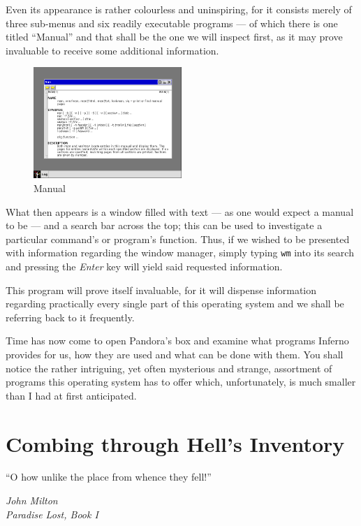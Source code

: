 \documentclass[a5paper,twoside,12pt]{report}
\begin{document}
  Even its appearance is rather colourless and uninspiring, for it consists merely of three sub-menus and six readily executable programs — of which there is one titled ``Manual'' and that shall be the one we will inspect first, as it may prove invaluable to receive some additional information.

  \begin{figure}
    \centering
    \includegraphics[width=0.5\textwidth]{imgs/manual.png}
    \caption{Manual}
  \end{figure}

  What then appears is a window filled with text — as one would expect a manual to be — and a search bar across the top; this can be used to investigate a particular command's or program's function. Thus, if we wished to be presented with information regarding the window manager, simply typing \texttt{wm} into its search and pressing the \textit{Enter} key will yield said requested information.

  This program will prove itself invaluable, for it will dispense information regarding practically every single part of this operating system and we shall be referring back to it frequently.

  Time has now come to open Pandora's box and examine what programs Inferno provides for us, how they are used and what can be done with them. You shall notice the rather intriguing, yet often mysterious and strange, assortment of programs this operating system has to offer which, unfortunately, is much smaller than I had at first anticipated.\newpage

  \chapter*{Combing through Hell's Inventory}

  \epigraph{``O how unlike the place from whence they fell!''}{\textit{John Milton\\Paradise Lost, Book I}}
\end{document}
